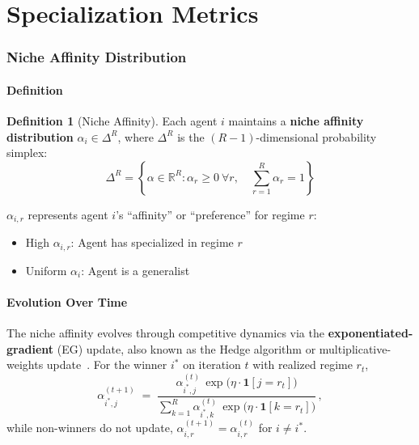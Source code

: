 \documentclass[11pt,a4paper]{article}
\theoremstyle{definition}
\newtheorem{definition}{Definition}[section]
\theoremstyle{plain}
\newcommand{\R}{\mathbb{R}}
\begin{document}
\newpage
\part{Specialization Metrics}

\section{Niche Affinity Distribution}

\subsection{Definition}

\begin{definition}[Niche Affinity]
Each agent $i$ maintains a \textbf{niche affinity distribution} $\alpha_i \in \Delta^R$, where $\Delta^R$ is the $(R-1)$-dimensional probability simplex:
\begin{equation}
\Delta^R = \left\{ \alpha \in \R^R : \alpha_r \geq 0 \ \forall r, \quad \sum_{r=1}^{R} \alpha_r = 1 \right\}
\end{equation}
\end{definition}

\begin{intuition}
$\alpha_{i,r}$ represents agent $i$'s ``affinity'' or ``preference'' for regime $r$:
\begin{itemize}
    \item High $\alpha_{i,r}$: Agent has specialized in regime $r$
    \item Uniform $\alpha_i$: Agent is a generalist
\end{itemize}
\end{intuition}

\subsection{Evolution Over Time}

The niche affinity evolves through competitive dynamics via the
\textbf{exponentiated-gradient} (EG) update, also known as the Hedge
algorithm or multiplicative-weights update~\cite{kivinen1997exponentiated,
arora2012multiplicative}. For the winner $i^*$ on iteration $t$ with
realized regime $r_t$,
\begin{equation}
\label{eq:eg_affinity_update}
\alpha_{i^*,j}^{(t+1)}
\;=\;
\frac{\alpha_{i^*,j}^{(t)} \, \exp\!\bigl(\eta \cdot \mathbf{1}[j = r_t]\bigr)}
     {\sum_{k=1}^{R} \alpha_{i^*,k}^{(t)} \, \exp\!\bigl(\eta \cdot \mathbf{1}[k = r_t]\bigr)}\,,
\end{equation}
while non-winners do not update, $\alpha_{i,r}^{(t+1)} = \alpha_{i,r}^{(t)}$
for $i \neq i^*$.
\end{document}
